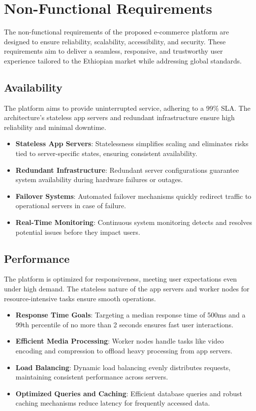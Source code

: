 \documentclass[12pt]{report}
\begin{document}
\section{Non-Functional Requirements}

The non-functional requirements of the proposed e-commerce platform are designed to
ensure reliability, scalability, accessibility, and security. These requirements aim to deliver a
seamless, responsive, and trustworthy user experience tailored to the Ethiopian market while
addressing global standards.

\subsection{Availability}

The platform aims to provide uninterrupted service, adhering to a 99\% SLA\@. The
architecture's stateless app servers and redundant infrastructure ensure high reliability and
minimal downtime.

\begin{itemize}
	\item \textbf{Stateless App Servers}: Statelessness simplifies scaling and eliminates risks tied to
	      server-specific states, ensuring consistent availability.
	\item \textbf{Redundant Infrastructure}: Redundant server configurations guarantee system
	      availability during hardware failures or outages.
	\item \textbf{Failover Systems}: Automated failover mechanisms quickly redirect traffic to
	      operational servers in case of failure.
	\item \textbf{Real-Time Monitoring}: Continuous system monitoring detects and resolves potential
	      issues before they impact users.
\end{itemize}

\subsection{Performance}

The platform is optimized for responsiveness, meeting user expectations even under high
demand. The stateless nature of the app servers and worker nodes for resource-intensive tasks
ensure smooth operations.

\begin{itemize}
	\item \textbf{Response Time Goals}: Targeting a median response time of 500ms and a 99th
	      percentile of no more than 2 seconds ensures fast user interactions.
	\item \textbf{Efficient Media Processing}: Worker nodes handle tasks like video encoding and
	      compression to offload heavy processing from app servers.
	\item \textbf{Load Balancing}: Dynamic load balancing evenly distributes requests, maintaining
	      consistent performance across servers.
	\item \textbf{Optimized Queries and Caching}: Efficient database queries and robust caching
	      mechanisms reduce latency for frequently accessed data.
\end{itemize}
\end{document}
